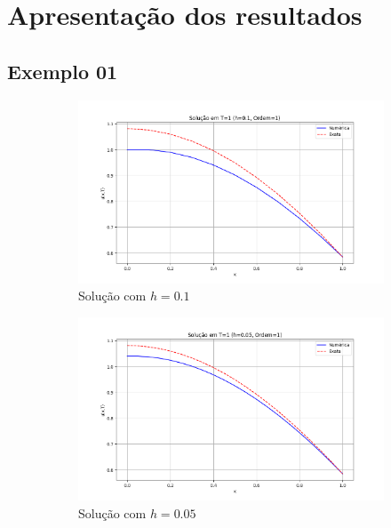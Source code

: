 \documentclass[column,amsmath,amssymb,floatfix]{revtex4}
\begin{document}
\section{Apresentação dos resultados}

\subsection{Exemplo 01}

\begin{figure}[H]
 \centering
 \begin{subfigure}{0.35\textwidth}
     \includegraphics[width=\textwidth]{img/ex0101.png}
     \caption{Solução com $h=0.1$}
     \label{fig:ex1_1}
 \end{subfigure}
 \begin{subfigure}{0.35\textwidth}
     \includegraphics[width=\textwidth]{img/ex0102.png}
     \caption{Solução com $h=0.05$}
     \label{fig:ex1_2}
 \end{subfigure}
 \begin{subfigure}{0.35\textwidth}

\end{subfigure}
\end{figure}
\end{document}
